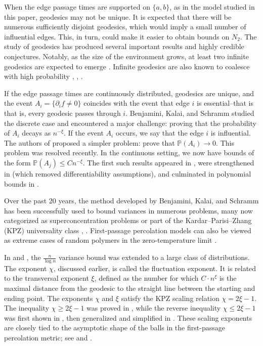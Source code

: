 \documentclass[reqno]{amsart}
\begin{document}
 When the edge passage times are supported on $\{a,b\}$, as in the model studied in this paper, geodesics may not be unique. It is expected that there will be numerous sufficiently disjoint geodesics, which would imply a small number of influential edges. This, in turn, could make it easier to obtain bounds on $N_2$. The study of geodesics has produced several important results and highly credible conjectures. Notably, as the size of the environment grows, at least two infinite geodesics are expected to emerge \cite{Hoffman2008}. Infinite geodesics are also known to coalesce with high probability \cite{Alexander2023},  \cite{Seppalainen2020}, \cite{KrishnanRassoulAghaSeppalainen2023}. 

If the edge passage times are continuously distributed, geodesics are unique, and the event $A_i=\{\partial_if\neq 0\}$ 
coincides with the event that edge $i$ is essential--that is that is, every geodesic passes through $i$.  
Benjamini, Kalai, and Schramm studied the discrete case and encountered a major challenge: proving that the probability of $A_i$ decays as $n^{-\xi}$. 
If the event $A_i$ occurs, we say that the edge $i$ is influential. The authors of \cite{benjamini2006} proposed a simpler problem: prove that $\mathbb P(A_i)\to 0$. 
This problem was resolved recently. 
In the continuous setting, we now have bounds of the form $\mathbb P(A_j)\leq Cn^{-\xi}$. 
The first such results appeared in \cite{DamronHanson2017}, were strengthened in \cite{AhlbergHoffman2019} (which removed differentiability assumptions), and culminated in polynomial bounds in \cite{DembinElboimPeled2024}.  

 
 
 Over the past 20 years, the method developed by Benjamini, Kalai, and Schramm has been successfully used to bound variances in numerous problems, many now categorized as superconcentration problems \cite{chatterjee2014} or part of the Kardar–Parisi–Zhang (KPZ) universality class \cite{AlbertsKhaninQuastel2014}, \cite{CorwinGhosalHammond2021}. First-passage percolation models can also be viewed as extreme cases of random polymers in the zero-temperature limit \cite{Zygouras2024}.
 
 




   


In \cite{benaim2008} and \cite{DamronHansonSosoe2015}, the $\frac{n}{\log n}$ variance bound was extended to a large class of distributions. The exponent $\chi$, discussed earlier, is called the fluctuation exponent. It is related to the transversal exponent $\xi$, defined as the number for which $C\cdot n^{\xi}$ is the maximal distance from the geodesic to the straight line between the starting and ending point. 
The exponents $\chi$ and $\xi$ satisfy the KPZ scaling relation $\chi=2\xi-1$. The inequality $\chi\geq 2\xi-1$ was proved in \cite{NewmanPiza1995}, while the reverse inequality $\chi\leq 2\xi-1$ was first 
shown in \cite{chatterjee2013},  then generalized and simplified in \cite{AuffingerDamron2014}. These scaling exponents are closely tied to the asymptotic shape of the balls in the first-passage percolation metric; see \cite{CoxDurrett1981} and \cite{ChatterjeeDey2016}.
\end{document}
